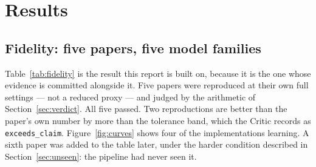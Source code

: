 \documentclass[11pt]{article}
\begin{document}
\section{Results}
\label{sec:results}

\subsection{Fidelity: five papers, five model families}
\label{sec:results5}

Table~\ref{tab:fidelity} is the result this report is built on, because it is the one whose
evidence is committed alongside it. Five papers were reproduced at their own full settings ---
not a reduced proxy --- and judged by the arithmetic of Section~\ref{sec:verdict}. All five
passed. Two reproductions are better than the paper's own number by more than the tolerance
band, which the Critic records as \texttt{exceeds\_claim}. Figure~\ref{fig:curves} shows four of
the implementations learning. A sixth paper was added to the table later, under the harder
condition described in Section~\ref{sec:unseen}: the pipeline had never seen it.
\end{document}
